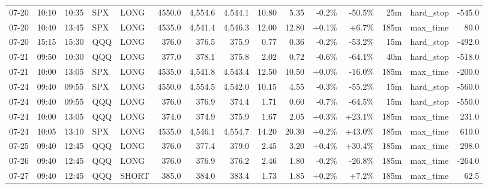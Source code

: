 \documentclass[11pt,a4paper,twoside]{article}
\begin{document}
\begin{landscape}
\begin{center}
\begin{longtable}{>{\color{txtmain}}l l l l l r r r r r r r r >{\color{txtmain}}l r}
07-20 & 10:10 & 10:35 & SPX & LONG & 4550.0 & 4,554.6 & 4,544.1 & 10.80 & 5.35 & \textcolor{lossred}{-0.2\%} & \textcolor{lossred}{-50.5\%} & 25m & hard\_stop & \textcolor{lossred}{-545.0} \\
07-20 & 10:40 & 13:45 & SPX & LONG & 4535.0 & 4,541.4 & 4,546.3 & 12.00 & 12.80 & \textcolor{wingreen}{+0.1\%} & \textcolor{wingreen}{+6.7\%} & 185m & max\_time & \textcolor{wingreen}{80.0} \\
07-20 & 15:15 & 15:30 & QQQ & LONG & 376.0 & 376.5 & 375.9 & 0.77 & 0.36 & \textcolor{lossred}{-0.2\%} & \textcolor{lossred}{-53.2\%} & 15m & hard\_stop & \textcolor{lossred}{-492.0} \\
07-21 & 09:50 & 10:30 & QQQ & LONG & 377.0 & 378.1 & 375.8 & 2.02 & 0.72 & \textcolor{lossred}{-0.6\%} & \textcolor{lossred}{-64.1\%} & 40m & hard\_stop & \textcolor{lossred}{-518.0} \\
07-21 & 10:00 & 13:05 & SPX & LONG & 4535.0 & 4,541.8 & 4,543.4 & 12.50 & 10.50 & \textcolor{wingreen}{+0.0\%} & \textcolor{lossred}{-16.0\%} & 185m & max\_time & \textcolor{lossred}{-200.0} \\
07-24 & 09:40 & 09:55 & SPX & LONG & 4550.0 & 4,554.5 & 4,542.0 & 10.15 & 4.55 & \textcolor{lossred}{-0.3\%} & \textcolor{lossred}{-55.2\%} & 15m & hard\_stop & \textcolor{lossred}{-560.0} \\
07-24 & 09:40 & 09:55 & QQQ & LONG & 376.0 & 376.9 & 374.4 & 1.71 & 0.60 & \textcolor{lossred}{-0.7\%} & \textcolor{lossred}{-64.5\%} & 15m & hard\_stop & \textcolor{lossred}{-550.0} \\
07-24 & 10:00 & 13:05 & QQQ & LONG & 374.0 & 374.9 & 375.9 & 1.67 & 2.05 & \textcolor{wingreen}{+0.3\%} & \textcolor{wingreen}{+23.1\%} & 185m & max\_time & \textcolor{wingreen}{231.0} \\
07-24 & 10:05 & 13:10 & SPX & LONG & 4535.0 & 4,546.1 & 4,554.7 & 14.20 & 20.30 & \textcolor{wingreen}{+0.2\%} & \textcolor{wingreen}{+43.0\%} & 185m & max\_time & \textcolor{wingreen}{610.0} \\
07-25 & 09:40 & 12:45 & QQQ & LONG & 376.0 & 377.4 & 379.0 & 2.45 & 3.20 & \textcolor{wingreen}{+0.4\%} & \textcolor{wingreen}{+30.4\%} & 185m & max\_time & \textcolor{wingreen}{298.0} \\
07-26 & 09:40 & 12:45 & QQQ & LONG & 376.0 & 376.9 & 376.2 & 2.46 & 1.80 & \textcolor{lossred}{-0.2\%} & \textcolor{lossred}{-26.8\%} & 185m & max\_time & \textcolor{lossred}{-264.0} \\
07-27 & 09:40 & 12:45 & QQQ & SHORT & 385.0 & 384.0 & 383.4 & 1.73 & 1.85 & \textcolor{wingreen}{+0.2\%} & \textcolor{wingreen}{+7.2\%} & 185m & max\_time & \textcolor{wingreen}{62.5} \\

\end{longtable}
\end{center}
\end{landscape}
\end{document}
